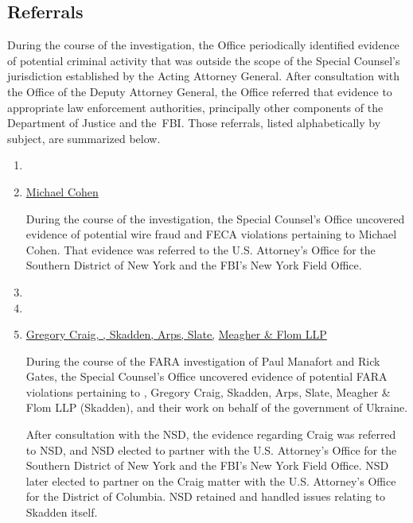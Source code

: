 \subsection{Referrals}

During the course of the investigation, the Office periodically identified evidence of potential criminal activity that was outside the scope of the Special Counsel's jurisdiction established by the Acting Attorney General.
After consultation with the Office of the Deputy Attorney General, the Office referred that evidence to appropriate law enforcement authorities, principally other components of the Department of Justice and the~FBI\null.
Those referrals, listed alphabetically by subject, are summarized below.

\begin{enumerate}[1.]

    \item {}


    \item \underline{Michael Cohen}

During the course of the investigation, the Special Counsel's Office uncovered evidence of potential wire fraud and FECA violations pertaining to Michael Cohen.
That evidence was referred to the U.S. Attorney's Office for the Southern District of New York and the FBI's New York Field Office.

    \item {}


    \item {}


    \item \underline{Gregory Craig, ,  Skadden, Arps, Slate,}\hfil\break
	    \underline{Meagher \& Flom LLP}

During the course of the FARA investigation of Paul Manafort and Rick Gates, the Special Counsel's Office uncovered evidence of potential FARA violations pertaining to , Gregory Craig, Skadden, Arps, Slate, Meagher \& Flom LLP (Skadden), and their work on behalf of the government of Ukraine.

After consultation with the NSD, the evidence regarding Craig  was referred to NSD, and NSD elected to partner with the U.S. Attorney's Office for the Southern District of New York and the FBI's New York Field Office.
NSD later elected to partner on the Craig matter with the U.S. Attorney's Office for the District of Columbia.
NSD retained and handled issues relating to Skadden itself.


\end{enumerate}
